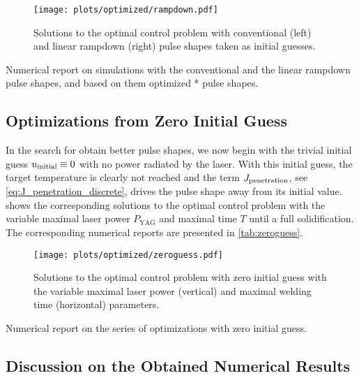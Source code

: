 \begin{figure} 
	\centering
	\texttt{[image: plots/optimized/rampdown.pdf]}
	\caption{Solutions to the optimal control problem with conventional (left) and linear rampdown (right) pulse shapes taken as initial guesses.}
	\label{fig:rampdown}
\end{figure}

\begin{table} 
	\centering
	
	\caption{Numerical report on simulations with the conventional and the linear rampdown pulse shapes, and based on them optimized * pulse shapes.}
	\label{tab:rampdown}
\end{table}


\subsection{Optimizations from Zero Initial Guess}

In the search for obtain better pulse shapes, we now begin with the trivial initial guess $u_\textup{initial} \equiv 0$ with no power radiated by the laser. 
With this initial guess, the target temperature is clearly not reached and the term $J_\textup{penetration}$, see \eqref{eq:J_penetration_discrete}, drives the pulse shape away from its initial value.
 shows the corresponding solutions to the optimal control problem with the variable maximal laser power $P_\text{YAG}$ and maximal time $T$ until a full solidification.
The corresponding numerical reports are presented in \cref{tab:zeroguess}.

\begin{figure} 
	\centering
	\texttt{[image: plots/optimized/zeroguess.pdf]}
	\caption{Solutions to the optimal control problem with zero initial guess with the variable maximal laser power (vertical) and maximal welding time (horizontal) parameters.}
	\label{fig:zeroguess}
\end{figure}

\begin{table} 
	\centering
	
	\caption{Numerical report on the series of optimizations with zero initial guess.}
	\label{tab:zeroguess}
\end{table}


\subsection{Discussion on the Obtained Numerical Results}

